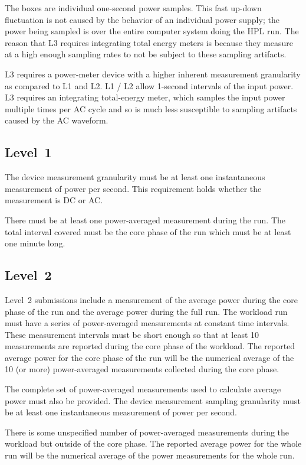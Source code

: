 \noindent
The boxes are individual one-second power samples.
This fast up-down fluctuation is not caused by the behavior of an individual power supply; the power being sampled is over the entire computer system doing the HPL run.
The reason that L3 requires integrating total energy meters is because they measure at a high enough sampling rates to not be subject to these sampling artifacts.
\wl

\noindent
L3 requires a power-meter device with a higher inherent measurement granularity as compared to L1 and L2.
L1 / L2 allow 1-second intervals of the input power.
L3 requires an integrating total-energy meter, which samples the input power multiple times per AC cycle and so is much less susceptible to sampling artifacts caused by the AC waveform.

\subsection{Level~1}
\noindent
The device measurement granularity must be at least one instantaneous measurement of power per second.
This requirement holds whether the measurement is DC or AC.
\wl

\noindent
There must be at least one power-averaged measurement during the run.
The total interval covered must be the core phase of the run which must be at
least one minute long.
\wl

\subsection{Level~2}
\noindent
Level~2 submissions include a measurement of the average power during the core phase of the run and the average power during the full run.
The workload run must have a series of power-averaged measurements at constant time intervals.
These measurement intervals must be short enough so that at least 10 measurements are reported during the core phase of the workload.
The reported average power for the core phase of the run will be the numerical average of the 10 (or more) power-averaged measurements collected during the core phase.
\wl

\noindent
The complete set of power-averaged measurements used to calculate average power must also be provided.
The device measurement sampling granularity must be at least one instantaneous measurement of power per second.
\wl

\noindent
There is some unspecified number of power-averaged measurements during the workload but outside of the core phase.
The reported average power for the whole run will be the numerical average of the power measurements for the whole run.
\wl


